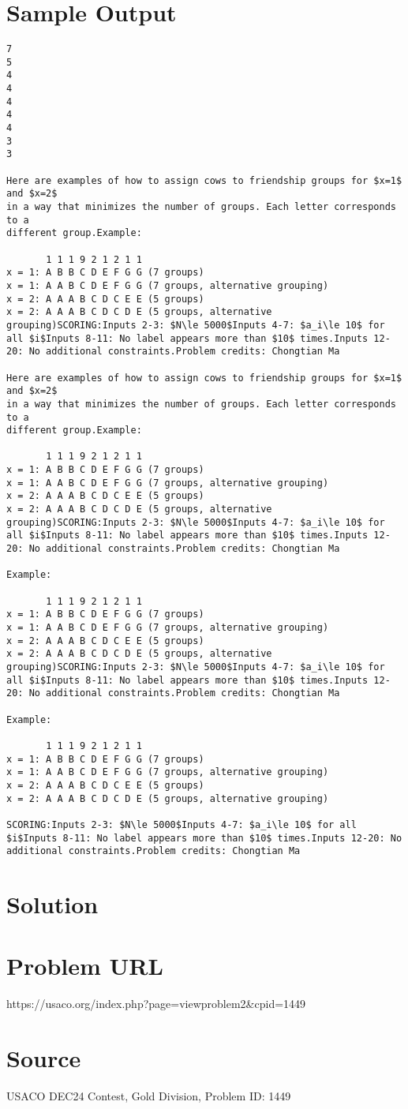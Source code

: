 \documentclass[12pt]{article}
\begin{document}
\section*{Sample Output}
\begin{verbatim}
7
5
4
4
4
4
4
3
3

Here are examples of how to assign cows to friendship groups for $x=1$ and $x=2$
in a way that minimizes the number of groups. Each letter corresponds to a
different group.Example:

       1 1 1 9 2 1 2 1 1
x = 1: A B B C D E F G G (7 groups)
x = 1: A A B C D E F G G (7 groups, alternative grouping)
x = 2: A A A B C D C E E (5 groups)
x = 2: A A A B C D C D E (5 groups, alternative grouping)SCORING:Inputs 2-3: $N\le 5000$Inputs 4-7: $a_i\le 10$ for all $i$Inputs 8-11: No label appears more than $10$ times.Inputs 12-20: No additional constraints.Problem credits: Chongtian Ma

Here are examples of how to assign cows to friendship groups for $x=1$ and $x=2$
in a way that minimizes the number of groups. Each letter corresponds to a
different group.Example:

       1 1 1 9 2 1 2 1 1
x = 1: A B B C D E F G G (7 groups)
x = 1: A A B C D E F G G (7 groups, alternative grouping)
x = 2: A A A B C D C E E (5 groups)
x = 2: A A A B C D C D E (5 groups, alternative grouping)SCORING:Inputs 2-3: $N\le 5000$Inputs 4-7: $a_i\le 10$ for all $i$Inputs 8-11: No label appears more than $10$ times.Inputs 12-20: No additional constraints.Problem credits: Chongtian Ma

Example:

       1 1 1 9 2 1 2 1 1
x = 1: A B B C D E F G G (7 groups)
x = 1: A A B C D E F G G (7 groups, alternative grouping)
x = 2: A A A B C D C E E (5 groups)
x = 2: A A A B C D C D E (5 groups, alternative grouping)SCORING:Inputs 2-3: $N\le 5000$Inputs 4-7: $a_i\le 10$ for all $i$Inputs 8-11: No label appears more than $10$ times.Inputs 12-20: No additional constraints.Problem credits: Chongtian Ma

Example:

       1 1 1 9 2 1 2 1 1
x = 1: A B B C D E F G G (7 groups)
x = 1: A A B C D E F G G (7 groups, alternative grouping)
x = 2: A A A B C D C E E (5 groups)
x = 2: A A A B C D C D E (5 groups, alternative grouping)

SCORING:Inputs 2-3: $N\le 5000$Inputs 4-7: $a_i\le 10$ for all $i$Inputs 8-11: No label appears more than $10$ times.Inputs 12-20: No additional constraints.Problem credits: Chongtian Ma
\end{verbatim}

\section*{Solution}


\section*{Problem URL}
https://usaco.org/index.php?page=viewproblem2&cpid=1449

\section*{Source}
USACO DEC24 Contest, Gold Division, Problem ID: 1449
\end{document}
